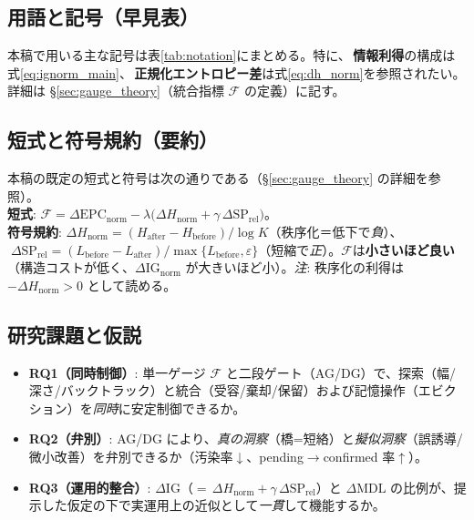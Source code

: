 \documentclass[ja=standard,xelatex]{bxjsarticle}
\newcommand{\F}{\mathcal{F}}
\newcommand{\gednorm}{\Delta\mathrm{EPC}_{\mathrm{norm}}}
\begin{document}
\subsection*{用語と記号（早見表）}
本稿で用いる主な記号は表\ref{tab:notation}にまとめる。特に、\,\textbf{情報利得}の構成は式\eqref{eq:ignorm_main}、\,\textbf{正規化エントロピー差}は式\eqref{eq:dh_norm}を参照されたい。詳細は §\ref{sec:gauge_theory}（統合指標 $\F$ の定義）に記す。

\subsection*{短式と符号規約（要約）}
本稿の既定の短式と符号は次の通りである（§\ref{sec:gauge_theory} の詳細を参照）。\\
\noindent\textbf{短式}: $\F=\gednorm-\lambda\bigl(\Delta H_{\mathrm{norm}}+\gamma\,\Delta\mathrm{SP}_{\mathrm{rel}}\bigr)$。\\
\noindent\textbf{符号規約}: $\Delta H_{\mathrm{norm}}=(H_{\mathrm{after}}-H_{\mathrm{before}})/\log K$（秩序化＝低下で\emph{負}）、$\;\Delta\mathrm{SP}_{\mathrm{rel}}=(L_{\mathrm{before}}-L_{\mathrm{after}})/\max\{L_{\mathrm{before}},\varepsilon\}$（短縮で\emph{正}）。$\F$は\textbf{小さいほど良い}（構造コストが低く、$\Delta\mathrm{IG}_{\mathrm{norm}}$ が大きいほど小）。\;\textit{注}: 秩序化の利得は $-\Delta H_{\mathrm{norm}}>0$ として読める。

\subsection*{研究課題と仮説}
\begin{itemize}[leftmargin=1.4em]
  \item \textbf{RQ1（同時制御）}: 単一ゲージ $\F$ と二段ゲート（AG/DG）で、探索（幅/深さ/バックトラック）と統合（受容/棄却/保留）および記憶操作（エビクション）を\emph{同時}に安定制御できるか。
  \item \textbf{RQ2（弁別）}: AG/DG により、\emph{真の洞察}（橋=短絡）と\emph{擬似洞察}（誤誘導/微小改善）を弁別できるか（汚染率$\downarrow$、pending$\to$confirmed 率$\uparrow$）。
  \item \textbf{RQ3（運用的整合）}: $\Delta\mathrm{IG}$（$=\,\Delta H_{\mathrm{norm}}+\gamma\,\Delta\mathrm{SP}_{\mathrm{rel}}$）と $\Delta\mathrm{MDL}$ の比例が、提示した仮定の下で実運用上の近似として\emph{一貫}して機能するか。
\end{itemize}
\end{document}
